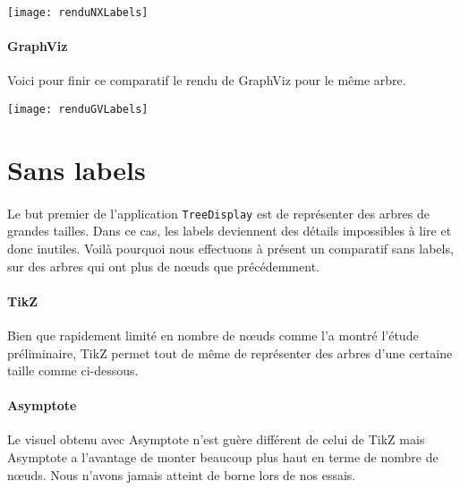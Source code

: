 \begin{center}
\texttt{[image: renduNXLabels]}
\end{center}
	
\paragraph{GraphViz} Voici pour finir ce comparatif le rendu de GraphViz pour le même arbre.\\

\begin{center}
\texttt{[image: renduGVLabels]}
\end{center}
	
	\section{Sans labels}
	
\paragraph{}Le but premier de l'application \verb|TreeDisplay| est de représenter des arbres de grandes tailles. Dans ce cas, les labels deviennent des détails impossibles à lire et donc inutiles. Voilà pourquoi nous effectuons à présent un comparatif sans labels, sur des arbres qui ont plus de n\oe uds que précédemment.

\paragraph{TikZ} Bien que rapidement limité en nombre de n\oe uds comme l'a montré l'étude préliminaire, TikZ permet tout de même de représenter des arbres d'une certaine taille comme ci-dessous.

\begin{center}
\resizebox {!}{0.50\columnwidth} {
}
\end{center}

\paragraph{Asymptote} Le visuel obtenu avec Asymptote n'est guère différent de celui de TikZ mais Asymptote a l'avantage de monter beaucoup plus haut en terme de nombre de n\oe uds. Nous n'avons jamais atteint de borne lors de nos essais.

